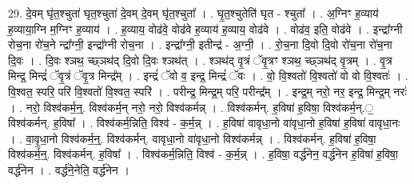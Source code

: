 \documentclass[17pt]{extarticle}
\begin{document}
29. दे॒वम् घृ॑त॒श्चुता॑ घृत॒श्चुता॑ दे॒वम् दे॒वम् घृ॑त॒श्चुता᳚ । . घृ॒त॒श्चुतेति॑ घृत - श्चुता᳚ । . अ॒ग्निꣳ ह॒व्याय॑ ह॒व्याया॒ग्नि म॒ग्निꣳ ह॒व्याय॑ । . ह॒व्याय॒ वोढ॑वे॒ वोढ॑वे ह॒व्याय॑ ह॒व्याय॒ वोढ॑वे । . वोढ॑व॒ इति॒ वोढ॑वे । . इन्द्रा᳚ग्नी रोच॒ना रो॑च॒ने न्द्रा᳚ग्नी॒ इन्द्रा᳚ग्नी रोच॒ना । . इन्द्रा᳚ग्नी॒ इतीन्द्र॑ - अ॒ग्नी॒ । . रो॒च॒ना दि॒वो दि॒वो रो॑च॒ना रो॑च॒ना दि॒वः । . दि॒वः श्ञथ॒ च्छ्ञथ॑द् दि॒वो दि॒वः श्ञथ॑त् । . श्ञथ॑द् वृ॒त्रं ॅवृ॒त्रꣳ श्ञथ॒ च्छ्ञथ॑द् वृ॒त्रम् । . वृ॒त्र मिन्द्र॒ मिन्द्रं॑ ॅवृ॒त्रं ॅवृ॒त्र मिन्द्र᳚म् । . इन्द्रं॑ ॅवो व॒ इन्द्र॒ मिन्द्रं॑ ॅवः । . वो॒ वि॒श्वतो॑ वि॒श्वतो॑ वो वो वि॒श्वतः॑ । . वि॒श्वत॒ स्परि॒ परि॑ वि॒श्वतो॑ वि॒श्वत॒ स्परि॑ । . परीन्द्र॒ मिन्द्र॒म् परि॒ परीन्द्र᳚म् । . इन्द्र॒म् नरो॒ नर॒ इन्द्र॒ मिन्द्र॒म् नरः॑ । . नरो॒ विश्व॑कर्म॒न्॒. विश्व॑कर्म॒न् नरो॒ नरो॒ विश्व॑कर्मन्न् । . विश्व॑कर्मन्. ह॒विषा॑ ह॒विषा॒ विश्व॑कर्म॒न्.॒ विश्व॑कर्मन्. ह॒विषा᳚ । . विश्व॑कर्म॒न्निति॒ विश्व॑ - क॒र्म॒न्न् । . ह॒विषा॑ वावृधा॒नो वा॑वृधा॒नो ह॒विषा॑ ह॒विषा॑ वावृधा॒नः । . वा॒वृ॒धा॒नो विश्व॑कर्म॒न्॒. विश्व॑कर्मन्. वावृधा॒नो वा॑वृधा॒नो विश्व॑कर्मन्न् । . विश्व॑कर्मन्. ह॒विषा॑ ह॒विषा॒ विश्व॑कर्म॒न्॒. विश्व॑कर्मन्. ह॒विषा᳚ । . विश्व॑कर्म॒न्निति॒ विश्व॑ - क॒र्म॒न्न् । . ह॒विषा॒ वर्द्ध॑नेन॒ वर्द्ध॑नेन ह॒विषा॑ 
ह॒विषा॒ वर्द्ध॑नेन । . वर्द्ध॑ने॒नेति॒ वर्द्ध॑नेन । \newline
\end{document}
